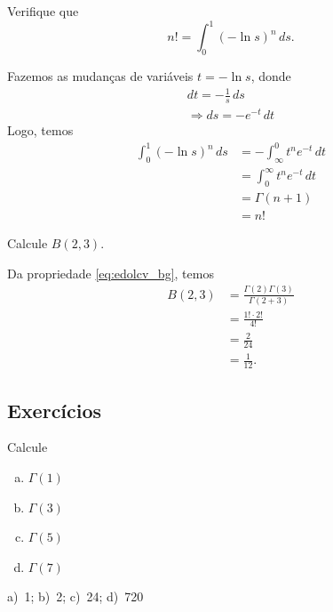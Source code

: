 \begin{exeresol}
  Verifique que
  \begin{equation}
    n! = \int_0^1 (-\ln s)^n\,ds.
  \end{equation}
\end{exeresol}
\begin{resol}
  Fazemos as mudanças de variáveis $t = -\ln s$, donde
  \begin{gather}
    dt = -\frac{1}{s}\,ds \\
    \Rightarrow ds = -e^{-t}\,dt
  \end{gather}
  Logo, temos
  \begin{align}
    \int_0^1 (-\ln s)^n\,ds &= -\int_\infty^0 t^ne^{-t}\,dt\\
                            &= \int_0^\infty t^ne^{-t}\,dt\\
                            &= \Gamma(n+1) \\
                            &= n!
  \end{align}
\end{resol}

\begin{exeresol}
  Calcule $B(2,3)$.
\end{exeresol}
\begin{resol}
  Da propriedade \eqref{eq:edolcv_bg}, temos
  \begin{align}
    B(2,3) &= \frac{\Gamma(2)\Gamma(3)}{\Gamma(2+3)}\\
           &= \frac{1!\cdot 2!}{4!} \\
           &= \frac{2}{24} \\
           &= \frac{1}{12}.
  \end{align}
\end{resol}

\subsection*{Exercícios}

\begin{exer}
  Calcule
  \begin{enumerate}[a)]
  \item $\Gamma(1)$\\
  \item $\Gamma(3)$\\
  \item $\Gamma(5)$\\
  \item $\Gamma(7)$
  \end{enumerate}
\end{exer}
\begin{resp}
  a)~1; b)~2; c)~24; d)~720
\end{resp}

